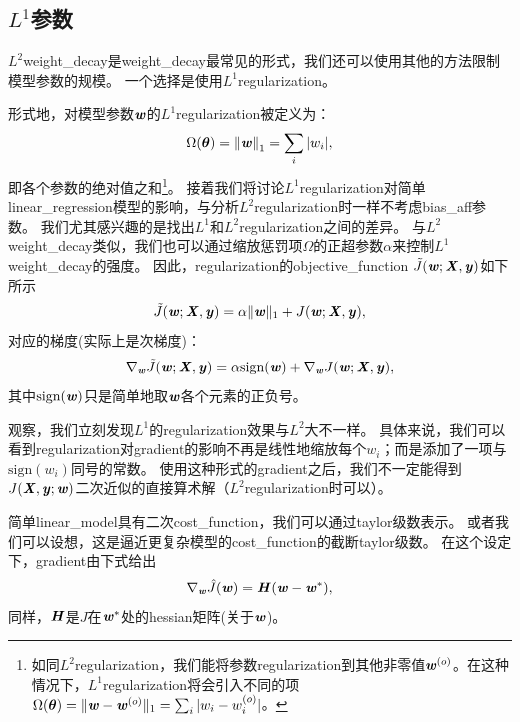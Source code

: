 \subsection{$L^1$参数}
\label{sec:l1_regularization}
$L^2$\gls{weight_decay}是\gls{weight_decay}最常见的形式，我们还可以使用其他的方法限制模型参数的规模。
一个选择是使用$L^1$\gls{regularization}。

形式地，对模型参数$\boldsymbol{\mathit{w}}$的$L^1$\gls{regularization}被定义为：
\begin{align}
 \Omega(\boldsymbol{\theta}) = \left\lVert \boldsymbol{\mathit{w}} \right\rVert_1 = \sum_i | w_i |,
 \end{align}
即各个参数的绝对值之和\footnote{如同$L^2$\gls{regularization}，我们能将参数\gls{regularization}到其他非零值$\boldsymbol{\mathit{w}}^{(o)}$。在这种情况下，$L^1$\gls{regularization}将会引入不同的项$\Omega(\boldsymbol{\theta})=
\|\boldsymbol{\mathit{w}} - \boldsymbol{\mathit{w}}^{(o)} \|_1 = \sum_i | w_i - w_i^{(o)} |$。}。
接着我们将讨论$L^1$\gls{regularization}对简单\gls{linear_regression}模型的影响，与分析$L^2$\gls{regularization}时一样不考虑\gls{bias_aff}参数。  
我们尤其感兴趣的是找出$L^1$和$L^2$\gls{regularization}之间的差异。
与$L^2$\gls{weight_decay}类似，我们也可以通过缩放惩罚项$\Omega$的正超参数$\alpha$来控制$L^1$\gls{weight_decay}的强度。 
因此，\gls{regularization}的\gls{objective_function} $\tilde{J}(\boldsymbol{\mathit{w}};\boldsymbol{\mathit{X}}, \boldsymbol{\mathit{y}})$如下所示
\begin{align}
\tilde{J}(\boldsymbol{\mathit{w}};\boldsymbol{\mathit{X}}, \boldsymbol{\mathit{y}}) = \alpha \| \boldsymbol{\mathit{w}} \|_1 +  J(\boldsymbol{\mathit{w}};\boldsymbol{\mathit{X}}, \boldsymbol{\mathit{y}}) ,
\end{align}
对应的梯度(实际上是次梯度)：
\begin{align}
\label{eq:subgradient}
  \nabla_{\Vw} \tilde{J}(\Vw; \MX, \Vy) = \alpha \text{sign}(\Vw) + \nabla_{\Vw} J(\Vw; \MX, \Vy), %
\end{align}
其中$\text{sign}(\boldsymbol{\mathit{w}})$只是简单地取$\boldsymbol{\mathit{w}}$各个元素的正负号。


观察，我们立刻发现$L^1$的\gls{regularization}效果与$L^2$大不一样。
具体来说，我们可以看到\gls{regularization}对\gls{gradient}的影响不再是线性地缩放每个$w_i$；而是添加了一项与$\text{sign}(w_i)$同号的常数。
使用这种形式的\gls{gradient}之后，我们不一定能得到$J(\boldsymbol{\mathit{X}}, \boldsymbol{\mathit{y}};\boldsymbol{\mathit{w}})$二次近似的直接算术解（$L^2$\gls{regularization}时可以）。 
 
简单\gls{linear_model}具有二次\gls{cost_function}，我们可以通过\gls{taylor}级数表示。
或者我们可以设想，这是逼近更复杂模型的\gls{cost_function}的截断\gls{taylor}级数。
在这个设定下，\gls{gradient}由下式给出
\begin{align}
  \nabla_{\boldsymbol{\mathit{w}}} \hat{J}(\boldsymbol{\mathit{w}}) = \boldsymbol{\mathit{H}} (\boldsymbol{\mathit{w}} - \boldsymbol{\mathit{w}}^*),
\end{align}
同样，$\boldsymbol{\mathit{H}}$是$J$在$\boldsymbol{\mathit{w}}^*$处的\gls{hessian}矩阵(关于$\boldsymbol{\mathit{w}}$)。

